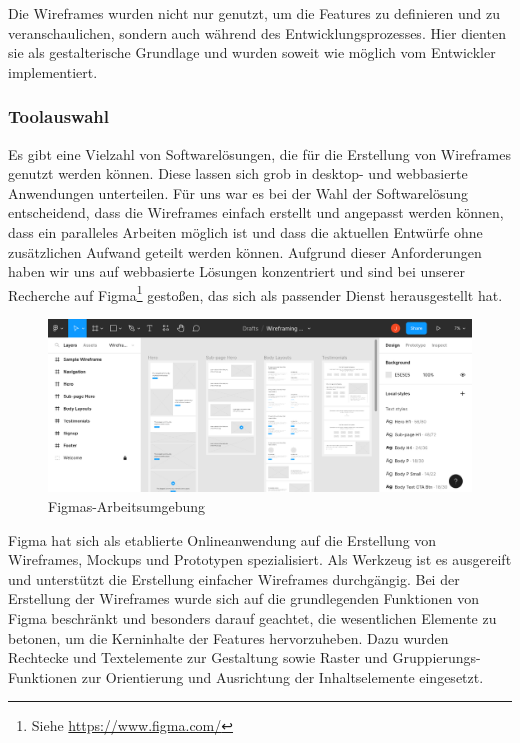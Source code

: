 
Die Wireframes wurden nicht nur genutzt, um die Features zu definieren und zu veranschaulichen, sondern auch während des Entwicklungsprozesses. Hier dienten sie als gestalterische Grundlage und wurden soweit wie möglich vom Entwickler implementiert.

\subsubsection{Toolauswahl}

Es gibt eine Vielzahl von Softwarelösungen, die für die Erstellung von Wireframes genutzt werden können. Diese lassen sich grob in desktop- und webbasierte Anwendungen unterteilen. Für uns war es bei der Wahl der Softwarelösung entscheidend, dass die Wireframes einfach erstellt und angepasst werden können, dass ein paralleles Arbeiten möglich ist und dass die aktuellen Entwürfe ohne zusätzlichen Aufwand geteilt werden können. Aufgrund dieser Anforderungen haben wir uns auf webbasierte Lösungen konzentriert und sind bei unserer Recherche auf Figma\footnote{Siehe \url{https://www.figma.com/}} gestoßen, das sich als passender Dienst herausgestellt hat.

\begin{figure}[!htb]
    \centering
    \includegraphics[width=\textwidth]{figures/jan/Wire_Figma.png}
    \caption[Figmas-Arbeitsumgebung]{Figmas-Arbeitsumgebung}
    \label{fig:figma}
\end{figure}

Figma hat sich als etablierte Onlineanwendung auf die Erstellung von Wireframes, Mockups und Prototypen spezialisiert. Als Werkzeug ist es ausgereift und unterstützt die Erstellung einfacher Wireframes durchgängig. Bei der Erstellung der Wireframes wurde sich auf die grundlegenden Funktionen von Figma beschränkt und besonders darauf geachtet, die wesentlichen Elemente zu betonen, um die Kerninhalte der Features hervorzuheben. Dazu wurden Rechtecke und Textelemente zur Gestaltung sowie Raster und Gruppierungs-Funktionen zur Orientierung und Ausrichtung der Inhaltselemente eingesetzt.

